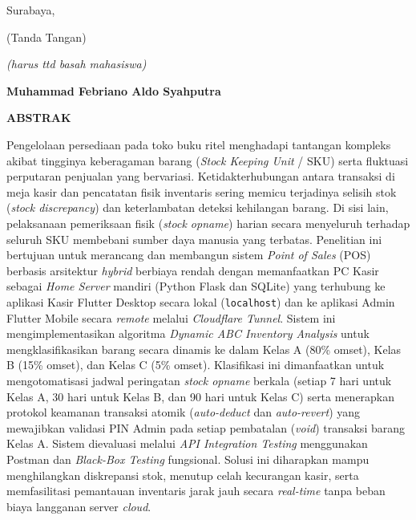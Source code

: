 \documentclass[11pt, a4paper]{article}
\begin{document}
\vspace{1.8cm}
\begin{flushright}
    \begin{minipage}{6.5cm}
    Surabaya, \dotfill\par
    \vspace{0.3cm}
    \centering
    (Tanda Tangan)\par
    \vspace{0.3cm}
    \textit{\textcolor{blue!80!black}{(harus ttd basah mahasiswa)}}\par
    \vspace{1.4cm}
    \textbf{Muhammad Febriano Aldo Syahputra}\par
    \end{minipage}
\end{flushright}

\newpage
{}
\begin{center}
    {\large \textbf{ABSTRAK}\par}
\end{center}
\vspace{0.6cm}

\noindent
Pengelolaan persediaan pada toko buku ritel menghadapi tantangan kompleks akibat tingginya keberagaman barang (\textit{Stock Keeping Unit} / SKU) serta fluktuasi perputaran penjualan yang bervariasi. Ketidakterhubungan antara transaksi di meja kasir dan pencatatan fisik inventaris sering memicu terjadinya selisih stok (\textit{stock discrepancy}) dan keterlambatan deteksi kehilangan barang. Di sisi lain, pelaksanaan pemeriksaan fisik (\textit{stock opname}) harian secara menyeluruh terhadap seluruh SKU membebani sumber daya manusia yang terbatas. Penelitian ini bertujuan untuk merancang dan membangun sistem \textit{Point of Sales} (POS) berbasis arsitektur \textit{hybrid} berbiaya rendah dengan memanfaatkan PC Kasir sebagai \textit{Home Server} mandiri (Python Flask dan SQLite) yang terhubung ke aplikasi Kasir Flutter Desktop secara lokal (\texttt{localhost}) dan ke aplikasi Admin Flutter Mobile secara \textit{remote} melalui \textit{Cloudflare Tunnel}. Sistem ini mengimplementasikan algoritma \textit{Dynamic ABC Inventory Analysis} untuk mengklasifikasikan barang secara dinamis ke dalam Kelas A (80\% omset), Kelas B (15\% omset), dan Kelas C (5\% omset). Klasifikasi ini dimanfaatkan untuk mengotomatisasi jadwal peringatan \textit{stock opname} berkala (setiap 7 hari untuk Kelas A, 30 hari untuk Kelas B, dan 90 hari untuk Kelas C) serta menerapkan protokol keamanan transaksi atomik (\textit{auto-deduct} dan \textit{auto-revert}) yang mewajibkan validasi PIN Admin pada setiap pembatalan (\textit{void}) transaksi barang Kelas A. Sistem dievaluasi melalui \textit{API Integration Testing} menggunakan Postman dan \textit{Black-Box Testing} fungsional. Solusi ini diharapkan mampu menghilangkan diskrepansi stok, menutup celah kecurangan kasir, serta memfasilitasi pemantauan inventaris jarak jauh secara \textit{real-time} tanpa beban biaya langganan server \textit{cloud}.
\end{document}
